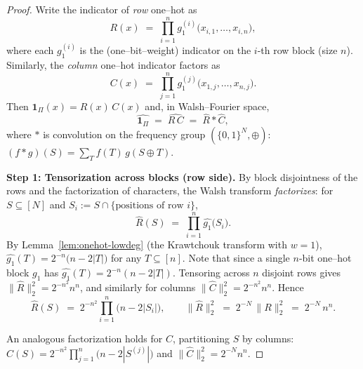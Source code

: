 \documentclass[a4paper,onecolumn,11pt,unpublished]{quantumarticle}
\theoremstyle{remark}
\begin{document}
\begin{proof}
Write the indicator of \emph{row} one–hot as
\[
  R(x)\;=\;\prod_{i=1}^{n} g^{(i)}_1\!\bigl(x_{i,1},\dots,x_{i,n}\bigr),
\]
where each $g_1^{(i)}$ is the (one–bit–weight) indicator on the $i$-th row block
(size $n$). Similarly, the \emph{column} one–hot indicator factors as
\[
  C(x)\;=\;\prod_{j=1}^{n} g^{(j)}_1\!\bigl(x_{1,j},\dots,x_{n,j}\bigr).
\]
Then $\mathbf{1}_\Pi(x)=R(x)\,C(x)$ and, in Walsh–Fourier space,
\[
  \widehat{\mathbf{1}_\Pi}\;=\;\widehat{R\,C}\;=\;\widehat{R} * \widehat{C},
\]
where $*$ is convolution on the frequency group $(\{0,1\}^N,\oplus)$:
$(f*g)(S)=\sum_{T} f(T)\,g(S\oplus T)$.

\medskip
\noindent\textbf{Step 1: Tensorization across blocks (row side).}
By block disjointness of the rows and the factorization of characters,
the Walsh transform \emph{factorizes}:
for $S\subseteq[N]$ and $S_i:=S\cap\{\text{positions of row }i\}$,
\[
  \widehat{R}(S)\;=\;\prod_{i=1}^{n} \widehat{g_1}\bigl(S_i\bigr).
\]
By Lemma~\ref{lem:onehot-lowdeg} (the Krawtchouk transform with $w=1$),
$\widehat{g_1}(T)=2^{-n}\bigl(n-2|T|\bigr)$ for any $T\subseteq[n]$. Note that since a single \(n\)-bit one–hot block \(g_1\) has \(\widehat{g_1}(T)=2^{-n}(n-2|T|)\).
Tensoring across \(n\) disjoint rows gives \(\|\widehat{R}\|_2^2=2^{-n^2}n^n\), and
similarly for columns \(\|\widehat{C}\|_2^2=2^{-n^2}n^n\). 
Hence
\begin{equation}
  \widehat{R}(S)
  \;=\;2^{-n^2}\prod_{i=1}^{n}\bigl(n-2|S_i|\bigr),
  \qquad
  \|\widehat{R}\|_2^2 \;=\; 2^{-N}\,\|R\|_2^2 \;=\; 2^{-N}\,n^n.
  \label{eq:Rhat-factor}
\end{equation}

An analogous factorization holds for $C$, partitioning $S$ by columns:
$\widehat{C}(S)=2^{-n^2}\prod_{j=1}^{n}\bigl(n-2|S^{(j)}|\bigr)$ and
$\|\widehat{C}\|_2^2=2^{-N}n^n$.


\end{proof}
\end{document}
